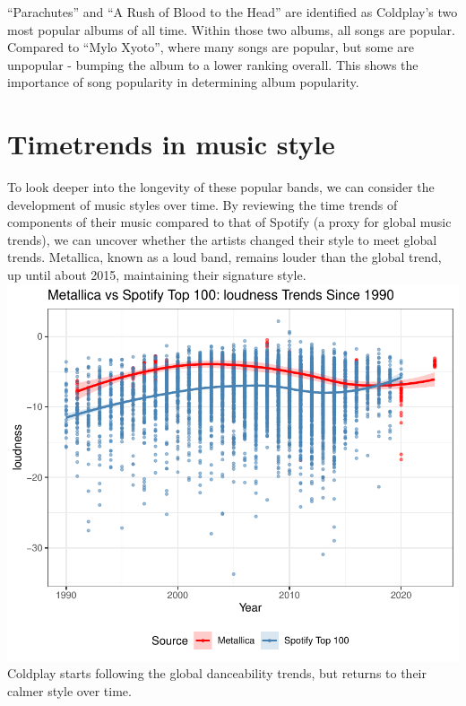 \documentclass[11pt,preprint]{elsarticle}
\numberwithin{equation}{section}
\numberwithin{figure}{section}
\numberwithin{table}{section}
\begin{document}
``Parachutes'' and ``A Rush of Blood to the Head'' are identified as
Coldplay's two most popular albums of all time. Within those two albums,
all songs are popular. Compared to ``Mylo Xyoto'', where many songs are
popular, but some are unpopular - bumping the album to a lower ranking
overall. This shows the importance of song popularity in determining
album popularity.

\newpage

\section{Timetrends in music style}\label{timetrends-in-music-style}

To look deeper into the longevity of these popular bands, we can
consider the development of music styles over time. By reviewing the
time trends of components of their music compared to that of Spotify (a
proxy for global music trends), we can uncover whether the artists
changed their style to meet global trends. Metallica, known as a loud
band, remains louder than the global trend, up until about 2015,
maintaining their signature style.
\includegraphics{Question2_files/figure-latex/unnamed-chunk-6-1.pdf}
Coldplay starts following the global danceability trends, but returns to
their calmer style over time.
\end{document}
